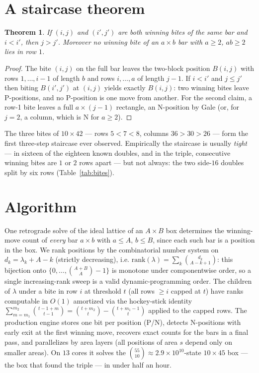 \documentclass[11pt]{article}
\newtheorem{theorem}{Theorem}
\begin{document}
\begin{center}
\end{center}

\section{A staircase theorem}
\begin{theorem}\label{thm:stair}
If $(i,j)$ and $(i',j')$ are both winning bites of the same bar and $i<i'$, then $j>j'$.
Moreover no winning bite of an $a\times b$ bar with $a\ge2$, $ab\ge2$ lies in row $1$.
\end{theorem}
\begin{proof}
The bite $(i,j)$ on the full bar leaves the two-block position $B(i,j)$ with rows
$1,\dots,i-1$ of length $b$ and rows $i,\dots,a$ of length $j-1$. If $i<i'$ and $j\le j'$
then biting $B(i',j')$ at $(i,j)$ yields exactly $B(i,j)$: two winning bites leave
P-positions, and no P-position is one move from another. For the second claim, a row-1 bite
leaves a full $a\times(j-1)$ rectangle, an N-position by Gale (or, for $j=2$, a column, which
is N for $a\ge2$).
\end{proof}
The three bites of $10\times42$ --- rows $5<7<8$, columns $36>30>26$ --- form the first
three-step staircase ever observed. Empirically the staircase is usually \emph{tight} --- in sixteen of the eighteen known
doubles, and in the triple, consecutive winning bites are $1$ or $2$ rows apart --- but not
always: the two side-$16$ doubles split by six rows (Table~\ref{tab:bites}).

\section{Algorithm}
One retrograde solve of the ideal lattice of an $A\times B$ box determines the winning-move
count of \emph{every} bar $a\times b$ with $a\le A$, $b\le B$, since each such bar is a
position in the box. We rank positions by the combinatorial number system on
$d_k=\lambda_k+A-k$ (strictly decreasing), i.e. $\mathrm{rank}(\lambda)=\sum_k
\binom{d_k}{A-k+1}$: this bijection onto $\{0,\dots,\binom{A+B}{A}-1\}$ is monotone under
componentwise order, so a single increasing-rank sweep is a valid dynamic-programming order.
The children of $\lambda$ under a bite in row $i$ at threshold $t$ (all rows $\ge i$ capped
at $t$) have ranks computable in $O(1)$ amortized via the hockey-stick identity
$\sum_{m=m_1}^{m_2}\binom{t-1+m}{t-1}=\binom{t+m_2}{t}-\binom{t+m_1-1}{t}$ applied to the
capped rows. The production engine stores one bit per position (P/N), detects N-positions
with early exit at the first winning move, recovers exact counts for the bars in a final
pass, and parallelizes by area layers (all positions of area $s$ depend only on smaller
areas). On $13$ cores it solves the $\binom{55}{10}\approx2.9\times10^{10}$-state
$10\times45$ box --- the box that found the triple --- in under half an hour.
\end{document}
